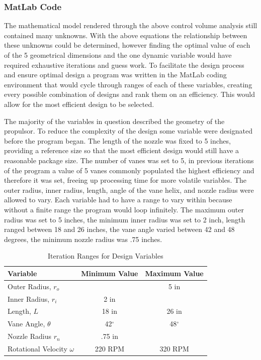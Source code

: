 \documentclass{report}
\begin{document}
\subsubsection{MatLab Code}
The mathematical model rendered through the above control volume analysis still contained many unknowns. With the above equations the relationship between these unknowns could be determined, however finding the optimal value of each of the 5 geometrical dimensions and the one dynamic variable would have required exhaustive iterations and guess work. To facilitate the design process and ensure optimal design a program was written in the MatLab coding environment that would cycle through ranges of each of these variables, creating every possible combination of designs and rank them on an efficiency. This would allow for the most efficient design to be selected.\par
The majority of the variables in question described the geometry of the propulsor. To reduce the complexity of the design some variable were designated before the program began. The length of the nozzle was fixed to 5 inches, providing a reference size so that the most efficient design would still have a reasonable package size. The number of vanes was set to 5, in previous iterations of the program a value of 5 vanes commonly populated the highest efficiency and therefore it was set, freeing up processing time for more volatile variables. The outer radius, inner radius, length, angle of the vane helix, and nozzle radius were allowed to vary. Each variable had to have a range to vary within because without a finite range the program would loop infinitely. The maximum outer radius was set to 5 inches, the minimum inner radius was set to 2 inch, length ranged between 18 and 26 inches, the vane angle varied between 42 and 48 degrees, the minimum nozzle radius was .75 inches.\par
\begin{table}[h]
\begin{center}
\begin{tabular}{l|c|c}
Variable&Minimum Value& Maximum Value\\
\hline
Outer Radius, $r_o$&& 5 in\\
Inner Radius, $r_i$&2 in&\\
Length, $L$ &18 in&26 in\\
Vane Angle, $\theta$&42$^{\circ}$&48$^{\circ}$\\
Nozzle Radius $r_n$&.75 in&\\
Rotational Velocity $\omega$ & 220 RPM & 320 RPM\\
\hline
\end{tabular}
\end{center}
\caption{Iteration Ranges for Design Variables}
\end{table}
\end{document}
